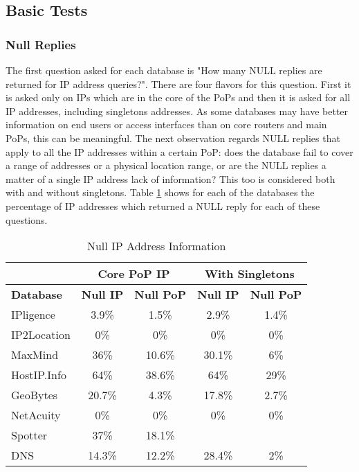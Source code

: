 \subsection{Basic Tests}  \label{sec:basic-tests}

\subsubsection{Null Replies}

The first question asked for each database is "How many NULL replies
are returned for IP address queries?". There are four flavors for
this question. First it is asked only on IPs which are in the core
of the PoPs and then it is asked for all IP addresses, including
singletons addresses. As some databases may have better information
on end users or access interfaces than on core routers and main
PoPs, this can be meaningful. The next observation regards NULL
replies that apply to all the IP addresses within a certain PoP:
does the database fail to cover a range of addresses or a physical
location range, or are the NULL replies a matter of a single IP
address lack of information? This too is considered both with and
without singletons. Table \ref{tab:nulldata} shows for each of the
databases the percentage of IP addresses which returned a NULL reply
for each of these questions.

\begin{table}
\begin{minipage}[b]{\linewidth}
\begin{center}
\small\addtolength{\tabcolsep}{-3pt}

\begin{tabular}{|l|c|c|c|c|}
 \hline   \bf{} & \multicolumn{2}{c|}{\bf{Core PoP IP }} & \multicolumn{2}{c|}{\bf{With Singletons
   }}\\
 \hline
    \bf{Database} & {\bf{Null IP }} & {\bf{Null PoP }} & {\bf{Null IP }} & {\bf{Null PoP}}\\
 \hline
     IPligence & 3.9\%&  1.5\% & 2.9\% & 1.4\% \\
\hline
     IP2Location & 0\%&  0\% & 0\% & 0\% \\
\hline
     MaxMind & 36\%&  10.6\% & 30.1\% & 6\% \\
\hline
     HostIP.Info & 64\%&  38.6\% & 64\% & 29\% \\
\hline
     GeoBytes & 20.7\%&  4.3\% & 17.8\% & 2.7\% \\
\hline
     NetAcuity & 0\%&  0\% & 0\% & 0\% \\
\hline
     Spotter & 37\%&  18.1\% &   &   \\
\hline
     DNS & 14.3\%& 12.2\% & 28.4\% &  2\%\\
\hline

\end{tabular}
\caption{Null IP Address Information } \label{tab:nulldata}
\end{center}
\end{minipage}
\end{table}
 
